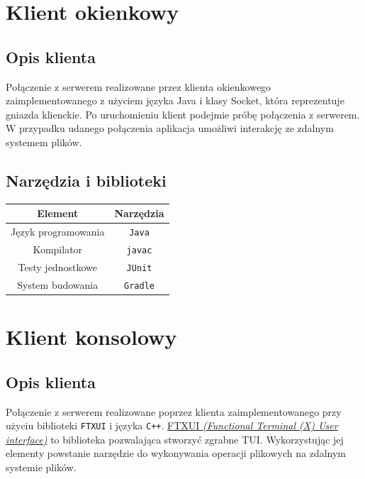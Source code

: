 \documentclass[8pt,a4paper]{article}
\begin{document}
\section{Klient okienkowy}

\subsection{Opis klienta}
Połączenie z serwerem realizowane przez klienta okienkowego zaimplementowanego z użyciem języka Java i klasy Socket, która reprezentuje gniazda klienckie. Po uruchomieniu klient podejmie próbę połączenia z serwerem. W przypadku udanego połączenia aplikacja umożliwi interakcję ze zdalnym systemem plików.

\subsection{Narzędzia i biblioteki}
\bgroup
    \begin{center}
        \def\arraystretch{1.3}
        \begin{tabular}{c|c}
            \textbf{Element} & \textbf{  Narzędzia  } \\
            \hline
            Język programowania & \texttt{Java}  \\
            \hline
            Kompilator & \texttt{javac} \\
            \hline
            Testy jednostkowe & \texttt{JUnit}  \\
            \hline
            System budowania & \texttt{Gradle}  \\
        \end{tabular}
    \end{center}
\egroup

\section{Klient konsolowy}

\subsection{Opis klienta}
Połączenie z serwerem realizowane poprzez klienta zaimplementowanego przy użyciu biblioteki \texttt{FTXUI} i języka \texttt{C++}. \href{https://github.com/ArthurSonzogni/FTXUI}{FTXUI \textit{(Functional Terminal (X) User interface)}} to biblioteka pozwalająca stworzyć zgrabne TUI. Wykorzystując jej elementy powstanie narzędzie do wykonywania operacji plikowych na zdalnym systemie plików.
\end{document}
